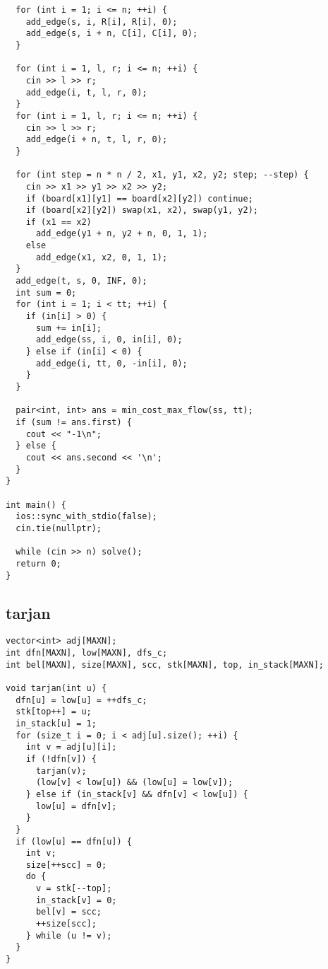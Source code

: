 \documentclass[twoside]{article}
\begin{document}
\begin{lstlisting}
  for (int i = 1; i <= n; ++i) {
    add_edge(s, i, R[i], R[i], 0);
    add_edge(s, i + n, C[i], C[i], 0);
  }

  for (int i = 1, l, r; i <= n; ++i) {
    cin >> l >> r;
    add_edge(i, t, l, r, 0);
  }
  for (int i = 1, l, r; i <= n; ++i) {
    cin >> l >> r;
    add_edge(i + n, t, l, r, 0);
  }

  for (int step = n * n / 2, x1, y1, x2, y2; step; --step) {
    cin >> x1 >> y1 >> x2 >> y2;
    if (board[x1][y1] == board[x2][y2]) continue;
    if (board[x2][y2]) swap(x1, x2), swap(y1, y2);
    if (x1 == x2)
      add_edge(y1 + n, y2 + n, 0, 1, 1);
    else
      add_edge(x1, x2, 0, 1, 1);
  }
  add_edge(t, s, 0, INF, 0);
  int sum = 0;
  for (int i = 1; i < tt; ++i) {
    if (in[i] > 0) {
      sum += in[i];
      add_edge(ss, i, 0, in[i], 0);
    } else if (in[i] < 0) {
      add_edge(i, tt, 0, -in[i], 0);
    }
  }

  pair<int, int> ans = min_cost_max_flow(ss, tt);
  if (sum != ans.first) {
    cout << "-1\n";
  } else {
    cout << ans.second << '\n';
  }
}

int main() {
  ios::sync_with_stdio(false);
  cin.tie(nullptr);

  while (cin >> n) solve();
  return 0;
}

\end{lstlisting}
\subsection{tarjan}
\begin{lstlisting}
vector<int> adj[MAXN];
int dfn[MAXN], low[MAXN], dfs_c;
int bel[MAXN], size[MAXN], scc, stk[MAXN], top, in_stack[MAXN];

void tarjan(int u) {
  dfn[u] = low[u] = ++dfs_c;
  stk[top++] = u;
  in_stack[u] = 1;
  for (size_t i = 0; i < adj[u].size(); ++i) {
    int v = adj[u][i];
    if (!dfn[v]) {
      tarjan(v);
      (low[v] < low[u]) && (low[u] = low[v]);
    } else if (in_stack[v] && dfn[v] < low[u]) {
      low[u] = dfn[v];
    }
  }
  if (low[u] == dfn[u]) {
    int v;
    size[++scc] = 0;
    do {
      v = stk[--top];
      in_stack[v] = 0;
      bel[v] = scc;
      ++size[scc];
    } while (u != v);
  }
}

\end{lstlisting}
\end{document}
